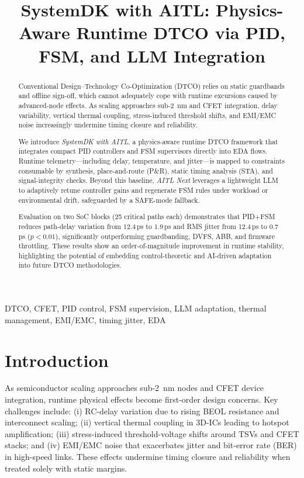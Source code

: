 \documentclass[conference]{IEEEtran}
\title{SystemDK with AITL: Physics-Aware Runtime DTCO via PID, FSM, and LLM Integration}
\author{%
  \IEEEauthorblockN{Shinichi Samizo}
  \IEEEauthorblockA{Independent Semiconductor Researcher\\
  Former Engineer at Seiko Epson Corporation\\
  Email: \href{mailto:shin3t72@gmail.com}{shin3t72@gmail.com}\\
  GitHub: \url{https://github.com/Samizo-AITL}}%
}
\begin{document}
\maketitle

\begin{abstract}
Conventional Design--Technology Co-Optimization (DTCO) relies on static guardbands and offline sign-off, which cannot adequately cope with runtime excursions caused by advanced-node effects. As scaling approaches sub-\SI{2}{\nano\meter} and CFET integration, delay variability, vertical thermal coupling, stress-induced threshold shifts, and EMI/EMC noise increasingly undermine timing closure and reliability.

We introduce \emph{SystemDK with AITL}, a physics-aware runtime DTCO framework that integrates compact PID controllers and FSM supervisors directly into EDA flows. Runtime telemetry---including delay, temperature, and jitter---is mapped to constraints consumable by synthesis, place-and-route (P\&R), static timing analysis (STA), and signal-integrity checks. Beyond this baseline, \emph{AITL Next} leverages a lightweight LLM to adaptively retune controller gains and regenerate FSM rules under workload or environmental drift, safeguarded by a SAFE-mode fallback.

Evaluation on two SoC blocks (25 critical paths each) demonstrates that PID+FSM reduces path-delay variation from 12.4\,ps to 1.9\,ps and RMS jitter from 12.4\,ps to 0.7\,ps ($p<0.01$), significantly outperforming guardbanding, DVFS, ABB, and firmware throttling. These results show an order-of-magnitude improvement in runtime stability, highlighting the potential of embedding control-theoretic and AI-driven adaptation into future DTCO methodologies.
\end{abstract}

\begin{IEEEkeywords}
DTCO, CFET, PID control, FSM supervision, LLM adaptation, thermal management, EMI/EMC, timing jitter, EDA
\end{IEEEkeywords}

\section{Introduction}
As semiconductor scaling approaches sub-\SI{2}{\nano\meter} nodes and CFET device integration, runtime physical effects become first-order design concerns. Key challenges include: (i) RC-delay variation due to rising BEOL resistance and interconnect scaling; (ii) vertical thermal coupling in 3D-ICs leading to hotspot amplification; (iii) stress-induced threshold-voltage shifts around TSVs and CFET stacks; and (iv) EMI/EMC noise that exacerbates jitter and bit-error rate (BER) in high-speed links. These effects undermine timing closure and reliability when treated solely with static margins.
\end{document}
